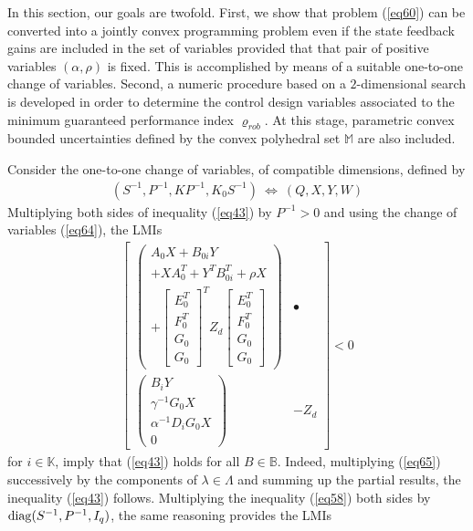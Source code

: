 \documentclass[twocolumn]{autarc_LH}
\newcommand{\Kn}{{\mathbb K}}
\begin{document}
In this section, our goals are twofold. First, we show that problem (\ref{eq60})  can be converted into a jointly convex programming problem even if the state feedback gains are included in the set of variables provided that that pair of positive variables $(\alpha, \rho)$ is fixed. This is accomplished by means of a suitable one-to-one change of variables. Second, a numeric procedure based on a $2$-dimensional search is developed in order to determine the control design variables associated to the minimum guaranteed performance index $\varrho_{rob}$. At this stage, parametric convex bounded uncertainties defined by the convex polyhedral set $\mathbb{M}$ are also included.

Consider the one-to-one change of variables, of compatible dimensions, defined by
\begin{align} 
\label{eq64}  (S^{-1}, P^{-1}, KP^{-1}, K_0S^{-1}) ~\Longleftrightarrow~ (Q, X, Y, W)
\end{align}
Multiplying both sides of inequality (\ref{eq43}) by $P^{-1}>0$ and using the change of variables (\ref{eq64}), the LMIs
\begin{align}
\label{eq65} \left [ \begin{array}{cc} \left ( \begin{array}{c} A_0 X + B_{0i} Y \\ + X A_0^T + Y^T B_{0i}^T + \rho X  \\ + \left [ \begin{array}{c} E_0^T \\ F_0^T \\ G_0 \\ G_0 \end{array} \right ]^T Z_d \left [ \begin{array}{c} E_0^T \\ F_0^T \\ G_0 \\ G_0 \end{array} \right ] \end{array} \right )  & \bullet   \\ \left (\begin{array}{c} B_iY \\ \gamma^{-1}G_0X \\ \alpha^{-1} D_{i} G_0 X \\ 0 \end{array} \right ) & -Z_d  \end{array} \!\! \right ] <0
\end{align}
for $i \in \Kn$, imply that (\ref{eq43}) holds for all $B \in \mathbb{B}$. Indeed, multiplying (\ref{eq65}) successively by the components of $\lambda \in \Lambda$ and summing up the partial results, the inequality (\ref{eq43}) follows. Multiplying the inequality (\ref{eq58}) both sides by ${\rm diag}(S^{-1}, P^{-1}, I_q)$, the same reasoning provides the LMIs 
\end{document}
